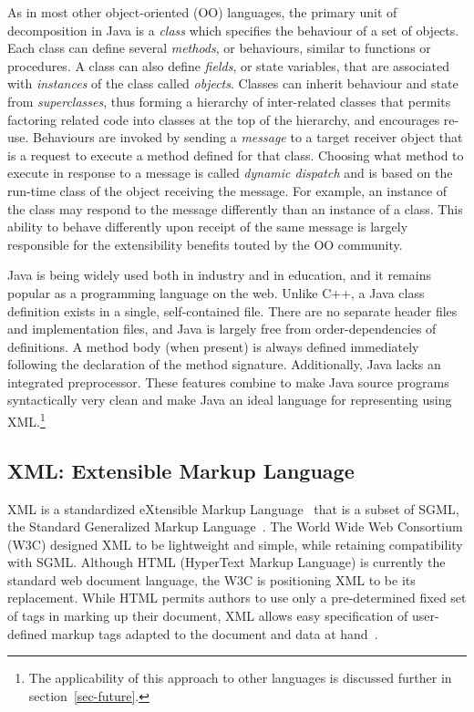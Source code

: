 \documentclass{article}
\begin{document}
\begin{multicols}{2}
As in most other object-oriented (OO) languages, the primary unit of
decomposition in Java is a \emph{class} which specifies the behaviour of
a set of objects.  Each class can define several \emph{methods}, or
behaviours, similar to functions or procedures. A class can also define
\emph{fields}, or state variables, that are associated with \emph{instances}
of the class called \emph{objects}. Classes can inherit behaviour and
state from \emph{superclasses}, thus forming a hierarchy of
inter-related classes that permits factoring related code into classes
at the top of the hierarchy, and encourages re-use.  Behaviours are
invoked by sending a \emph{message} to a target receiver object that is
a request to execute a method defined for that class.  Choosing what
method to execute in response to a message is called \emph{dynamic
  dispatch} and is based on the run-time class of the object receiving
the message.  For example, an instance of the 
class may respond to the  message differently than an
instance of a  class.  This ability to behave differently
upon receipt of the same message is largely responsible for the
extensibility benefits touted by the OO community.
    

Java is being widely used both in industry and in education, and it
remains popular as a programming language on the web.  Unlike C++, a
Java class definition exists in a single, self-contained file.  There
are no separate header files and implementation files, and Java is
largely free from order-dependencies of definitions.  A method body
(when present) is always defined immediately following the declaration
of the method signature.  Additionally, Java lacks an integrated
preprocessor.  These features combine to make Java source programs
syntactically very clean and make Java an ideal language for
representing using XML.\footnote{The applicability of this approach to
  other languages is discussed further in section~\ref{sec-future}.}

\subsection{XML: Extensible Markup Language}

XML is a standardized eXtensible Markup Language~\cite{XML} that is a
subset of SGML, the Standard Generalized Markup Language~\cite{SGML}.
The World Wide Web Consortium (W3C) designed XML to be lightweight and
simple, while retaining compatibility with SGML.  Although HTML
(HyperText Markup Language) is currently the standard web document
language, the W3C is positioning XML to be its replacement.  While HTML
permits authors to use only a pre-determined fixed set of tags in
marking up their document, XML allows easy specification of user-defined
markup tags adapted to the document and data at
hand~\cite{Goosens99,Goldfarb98}.


\end{multicols}
\end{document}
